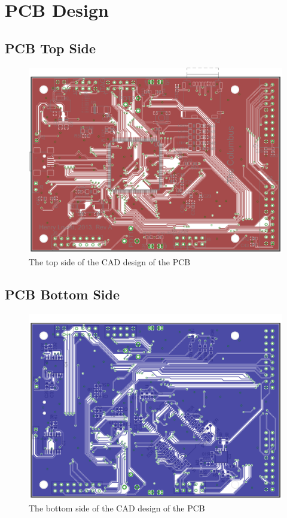 \chapter{PCB Design} \label{Appendix:PCB}
\section{PCB Top Side}
\begin{figure}[ht!]
\centering
\includegraphics[angle=90,width=\textwidth,height=\textheight-5cm,keepaspectratio]{Figures/ColumbusPCBTop_GP.png} 
\caption{The top side of the CAD design of the PCB}
\label{fig:PCB:Eagle:Top}
\end{figure}
\clearpage
\section{PCB Bottom Side}
\begin{figure}[ht!]
\centering
\includegraphics[angle=90,width=\textwidth,height=\textheight-5cm,keepaspectratio]{Figures/ColumbusPCBBottom_GP.png} 
\caption{The bottom side of the CAD design of the PCB}
\label{fig:PCB:Eagle:Bottom}
\end{figure}
\clearpage
